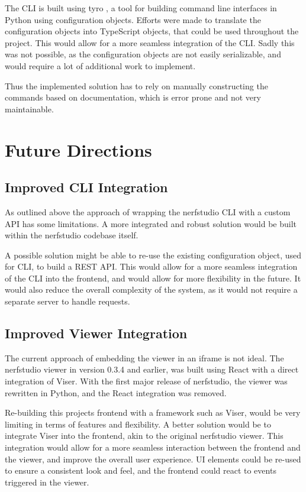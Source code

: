 The CLI is built using tyro \cite{yi_brentyityro_2024}, a tool for building command line interfaces in Python using configuration objects.
Efforts were made to translate the configuration objects into TypeScript objects, that could be used throughout the project.
This would allow for a more seamless integration of the CLI.
Sadly this was not possible, as the configuration objects are not easily serializable, and would require a lot of additional work to implement.

Thus the implemented solution has to rely on manually constructing the commands based on documentation, which is error prone and not very maintainable.

\section{Future Directions}
\label{sec:system:future}

\subsection*{Improved CLI Integration}

As outlined above the approach of wrapping the nerfstudio CLI with a custom API has some limitations.
A more integrated and robust solution would be built within the nerfstudio codebase itself.

A possible solution might be able to re-use the existing configuration object, used for CLI, to build a REST API.
This would allow for a more seamless integration of the CLI into the frontend, and would allow for more flexibility in the future.
It would also reduce the overall complexity of the system, as it would not require a separate server to handle requests.

\subsection*{Improved Viewer Integration}

The current approach of embedding the viewer in an iframe is not ideal.
The nerfstudio viewer in version 0.3.4 and earlier, was built using React with a direct integration of Viser.
With the first major release of nerfstudio, the viewer was rewritten in Python, and the React integration was removed.

Re-building this projects frontend with a framework such as Viser, would be very limiting in terms of features and flexibility.
A better solution would be to integrate Viser into the frontend, akin to the original nerfstudio viewer.
This integration would allow for a more seamless interaction between the frontend and the viewer, and improve the overall user experience.
UI elements could be re-used to ensure a consistent look and feel, and the frontend could react to events triggered in the viewer.

